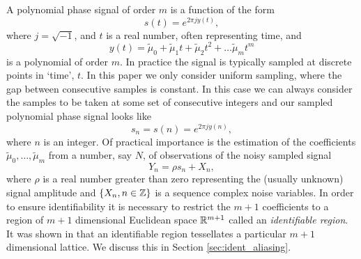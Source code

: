\documentclass[journal]{IEEEtran}
\begin{document}
A polynomial phase signal of order $m$ is a function of the form
\[
s(t) = e^{2\pi j y(t)},
\]
where $j = \sqrt{-1}$, and $t$ is a real number, often representing time, and 
\[
y(t) = \tilde{\mu}_0 +\tilde{\mu}_1 t + \tilde{\mu}_2 t^2 + \dots \tilde{\mu}_m t^m
\]
is a polynomial of order $m$.  In practice the signal is typically sampled at discrete points in `time', $t$. In this paper we only consider uniform sampling, where the gap between consecutive samples is constant. In this case we can always consider the samples to be taken at some set of consecutive integers and our sampled polynomial phase signal looks like
\[
s_n = s(n) = e^{2\pi j y(n)},
\] 
where $n$ is an integer.  Of practical importance is the estimation of the coefficients $\tilde{\mu}_0, \dots, \tilde{\mu}_m$ from a number, say $N$, of observations of the noisy sampled signal
\begin{equation}\label{eq:Y_nsamplednoisey}
Y_n = \rho s_n + X_n,
\end{equation}
where $\rho$ is a real number greater than zero representing the (usually unknown) signal amplitude and $\{X_n, n \in {\mathbb Z}\}$ is a sequence complex noise variables. In order to ensure identifiability it is necessary to restrict the $m+1$ coefficients to a region of $m+1$ dimensional Euclidean space ${\mathbb R}^{m+1}$ called an \emph{identifiable region}.  It was shown in \cite{McKilliam2009IndentifiabliltyAliasingPolyphase} that an identifiable region tessellates a particular $m+1$ dimensional lattice.  We discuss this in Section \ref{sec:ident_aliasing}.
\end{document}
